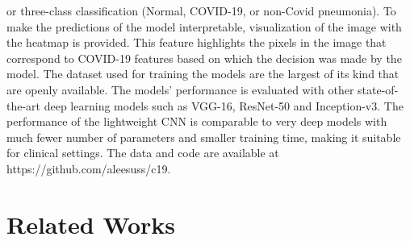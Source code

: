 \documentclass[10pt,journal,compsoc]{IEEEtran}
\begin{document}
or three-class classification (Normal, COVID-19, or non-Covid pneumonia). To make the predictions of the model interpretable, visualization of the image with the heatmap is provided. This feature highlights the pixels in the image that correspond to COVID-19 features based on which the decision was made by the model. The dataset used for training the models are the largest of its kind that are openly available. The models’ performance is evaluated with other state-of-the-art deep learning models such as VGG-16, ResNet-50 and Inception-v3. The performance of the lightweight CNN is comparable to very deep  models with much fewer number of parameters and smaller training time, making it suitable for clinical settings. The data and code are available at https://github.com/aleesuss/c19. 


\section{Related Works}
\end{document}
